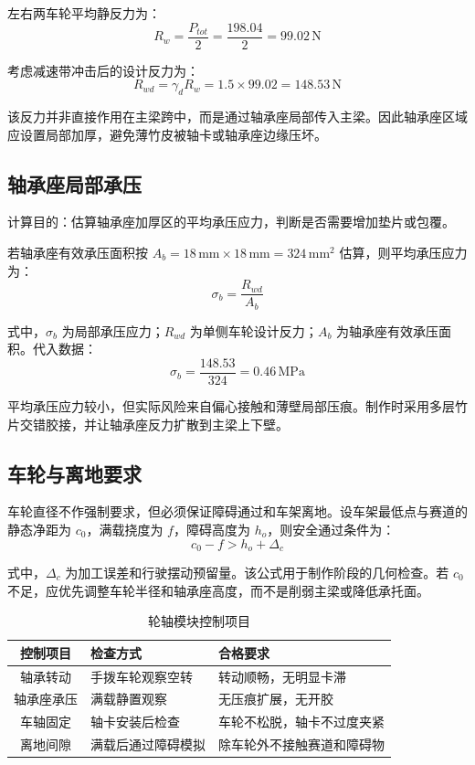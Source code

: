\documentclass[UTF8,a4paper,12pt,fontset=none]{ctexart}
\numberwithin{equation}{section}
\numberwithin{figure}{section}
\numberwithin{table}{section}
\newcommand{\mm}{\,\mathrm{mm}}
\newcommand{\Nunit}{\,\mathrm{N}}
\newcommand{\MPa}{\,\mathrm{MPa}}
\begin{document}
左右两车轮平均静反力为：
\begin{equation}
  R_w=\frac{P_{tot}}{2}=\frac{198.04}{2}=99.02\Nunit
\end{equation}

考虑减速带冲击后的设计反力为：
\begin{equation}
  R_{wd}=\gamma_dR_w=1.5\times99.02=148.53\Nunit
\end{equation}

该反力并非直接作用在主梁跨中，而是通过轴承座局部传入主梁。因此轴承座区域应设置局部加厚，避免薄竹皮被轴卡或轴承座边缘压坏。

\subsection{轴承座局部承压}
计算目的：估算轴承座加厚区的平均承压应力，判断是否需要增加垫片或包覆。

若轴承座有效承压面积按 $A_b=18\mm\times18\mm=324\mm^2$ 估算，则平均承压应力为：
\begin{equation}
  \sigma_b=\frac{R_{wd}}{A_b}
\end{equation}

式中，$\sigma_b$ 为局部承压应力；$R_{wd}$ 为单侧车轮设计反力；$A_b$ 为轴承座有效承压面积。代入数据：
\begin{equation}
  \sigma_b=\frac{148.53}{324}=0.46\MPa
\end{equation}

平均承压应力较小，但实际风险来自偏心接触和薄壁局部压痕。制作时采用多层竹片交错胶接，并让轴承座反力扩散到主梁上下壁。

\subsection{车轮与离地要求}
车轮直径不作强制要求，但必须保证障碍通过和车架离地。设车架最低点与赛道的静态净距为 $c_0$，满载挠度为 $f$，障碍高度为 $h_o$，则安全通过条件为：
\begin{equation}
  c_0-f>h_o+\Delta_c
\end{equation}

式中，$\Delta_c$ 为加工误差和行驶摆动预留量。该公式用于制作阶段的几何检查。若 $c_0$ 不足，应优先调整车轮半径和轴承座高度，而不是削弱主梁或降低承托面。

\begin{table}[H]
\centering
\caption{轮轴模块控制项目}
\label{tab:wheel-control}
\begin{tabularx}{\linewidth}{cY Y}
\toprule
\textbf{控制项目} & \textbf{检查方式} & \textbf{合格要求} \\\midrule
轴承转动 & 手拨车轮观察空转 & 转动顺畅，无明显卡滞 \\
轴承座承压 & 满载静置观察 & 无压痕扩展，无开胶 \\
车轴固定 & 轴卡安装后检查 & 车轮不松脱，轴卡不过度夹紧 \\
离地间隙 & 满载后通过障碍模拟 & 除车轮外不接触赛道和障碍物 \\
\bottomrule
\end{tabularx}
\end{table}
\end{document}
